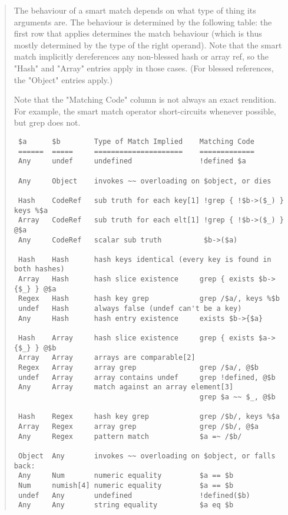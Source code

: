 \begin{it}
\begin{quotation}
The behaviour of a smart match depends on what type of thing its arguments
are. The behaviour is determined by the following table: 
the first
row that applies determines the match behaviour (which is thus mostly
determined by the type of the right operand). 
Note that the smart match
implicitly dereferences any non-blessed hash or array ref, so the "Hash"
and "Array" entries apply in those cases. (For blessed references, the
"Object" entries apply.)

Note that the "Matching Code" column is not always an exact rendition. For
example, the smart match operator short-circuits whenever possible,
but grep does not.

\begin{center}
\begin{verbatim}
 $a      $b        Type of Match Implied    Matching Code
 ======  =====     =====================    =============
 Any     undef     undefined                !defined $a

 Any     Object    invokes ~~ overloading on $object, or dies

 Hash    CodeRef   sub truth for each key[1] !grep { !$b->($_) } keys %$a
 Array   CodeRef   sub truth for each elt[1] !grep { !$b->($_) } @$a
 Any     CodeRef   scalar sub truth          $b->($a)

 Hash    Hash      hash keys identical (every key is found in both hashes)
 Array   Hash      hash slice existence     grep { exists $b->{$_} } @$a
 Regex   Hash      hash key grep            grep /$a/, keys %$b
 undef   Hash      always false (undef can't be a key)
 Any     Hash      hash entry existence     exists $b->{$a}

 Hash    Array     hash slice existence     grep { exists $a->{$_} } @$b
 Array   Array     arrays are comparable[2]
 Regex   Array     array grep               grep /$a/, @$b
 undef   Array     array contains undef     grep !defined, @$b
 Any     Array     match against an array element[3]
                                            grep $a ~~ $_, @$b

 Hash    Regex     hash key grep            grep /$b/, keys %$a
 Array   Regex     array grep               grep /$b/, @$a
 Any     Regex     pattern match            $a =~ /$b/

 Object  Any       invokes ~~ overloading on $object, or falls back:
 Any     Num       numeric equality         $a == $b
 Num     numish[4] numeric equality         $a == $b
 undef   Any       undefined                !defined($b)
 Any     Any       string equality          $a eq $b
\end{verbatim}
\end{center}

\end{quotation}
\end{it}

